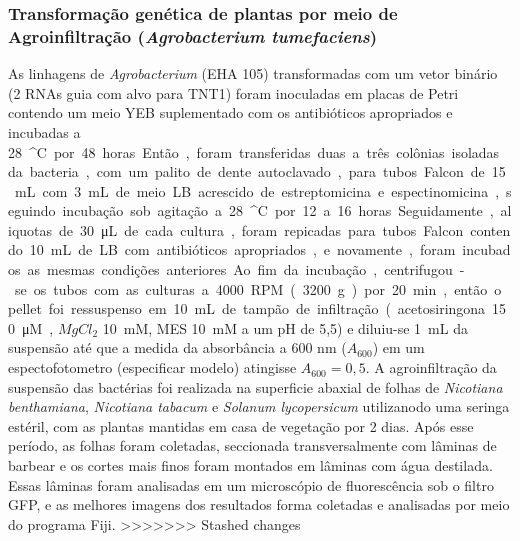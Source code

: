 \subsubsection{Transformação genética de plantas por meio de Agroinfiltração (\textit{Agrobacterium tumefaciens})}
As linhagens de \textit{Agrobacterium} (EHA 105) transformadas com um vetor binário (2 RNAs guia com alvo para TNT1) foram inoculadas em placas de Petri contendo um meio YEB suplementado com os antibióticos apropriados e incubadas a \qty{28}{^\circ C} por 48 horas. Então, foram transferidas duas a três colônias isoladas da bacteria, com um palito de dente autoclavado, para tubos Falcon de \qty{15}{mL} com \qty{3}{mL} de meio LB acrescido de estreptomicina e espectinomicina, seguindo incubação sob agitação a \qty{28}{^\circ C} por 12 a 16 horas. Seguidamente, aliquotas de \qty{30}{\micro L} de cada cultura, foram repicadas para tubos Falcon contendo \qty{10}{mL} de LB com antibióticos apropriados, e novamente, foram incubados as mesmas condições anteriores. Ao fim da incubação, centrifugou-se os tubos com as culturas a \qty{4000}{RPM} (\qty{3200}{g}) por \qty{20}{min}, então o pellet foi ressuspenso em \qty{10}{mL} de tampão de infiltração (acetosiringona \qty{150}{\micro M}, $MgCl_2$ \qty{10}{mM}, MES \qty{10}{mM} a um pH de 5,5) e diluiu-se \qty{1}{mL} da suspensão até que a medida da absorbância a 600 nm ($A_600$) em um espectofotometro (especificar modelo)  atingisse $A_600 = 0,5$.
A agroinfiltração da suspensão das bactérias foi realizada na superficie abaxial de folhas de \textit{Nicotiana benthamiana}, \textit{Nicotiana tabacum} e \textit{Solanum lycopersicum} utilizanodo uma seringa estéril, com as plantas mantidas em casa de vegetação por 2 dias. Após esse período, as folhas foram coletadas, seccionada transversalmente com lâminas de barbear e os cortes mais finos foram montados em lâminas com água destilada. Essas lâminas foram analisadas em um microscópio de fluorescência sob o filtro GFP, e as melhores imagens dos resultados forma coletadas e analisadas por meio do programa Fiji.  
>>>>>>> Stashed changes
